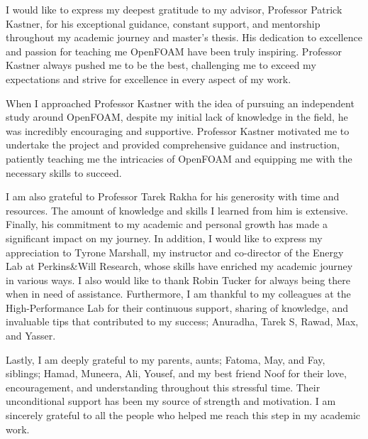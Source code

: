 
\begin{acknowledgments}

I would like to express my deepest gratitude to my advisor, Professor Patrick Kastner, for his exceptional guidance, constant support, and mentorship throughout my academic journey and master's thesis. His dedication to excellence and passion for teaching me OpenFOAM have been truly inspiring. Professor Kastner always pushed me to be the best, challenging me to exceed my expectations and strive for excellence in every aspect of my work. 

When I approached Professor Kastner with the idea of pursuing an independent study around OpenFOAM, despite my initial lack of knowledge in the field, he was incredibly encouraging and supportive. Professor Kastner motivated me to undertake the project and provided comprehensive guidance and instruction, patiently teaching me the intricacies of OpenFOAM and equipping me with the necessary skills to succeed.

I am also grateful to Professor Tarek Rakha for his generosity with time and resources. The amount of knowledge and skills I learned from him is extensive. Finally, his commitment to my academic and personal growth has made a significant impact on my journey. In addition, I would like to express my appreciation to Tyrone Marshall, my instructor and co-director of the Energy Lab at Perkins\&Will Research, whose skills have enriched my academic journey in various ways. I also would like to thank Robin Tucker for always being there when in need of assistance. Furthermore, I am thankful to my colleagues at the High-Performance Lab for their continuous support, sharing of knowledge, and invaluable tips that contributed to my success; Anuradha, Tarek S, Rawad, Max, and Yasser.

Lastly, I am deeply grateful to my parents, aunts; Fatoma, May, and Fay, siblings; Hamad, Muneera, Ali, Yousef, and my best friend Noof for their love, encouragement, and understanding throughout this stressful time. Their unconditional support has been my source of strength and motivation.
I am sincerely grateful to all the people who helped me reach this step in my academic work.



\end{acknowledgments}
